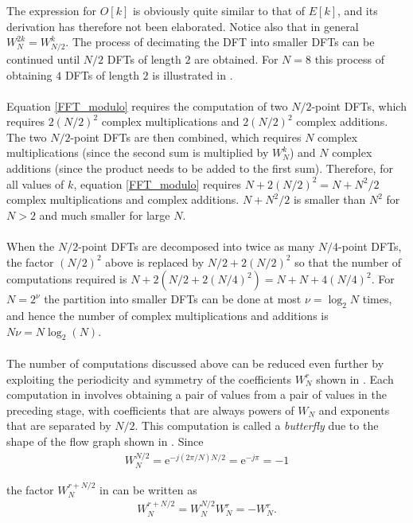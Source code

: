 The expression for $O[k]$ is obviously quite similar to that of $E[k]$, and its derivation has therefore not been elaborated. Notice also that in general $W_N^{2k} = W_{N/2}^k$. The process of decimating the DFT into smaller DFTs can be continued until $N/2$ DFTs of length $2$ are obtained. For $N = 8$ this process of obtaining $4$ DFTs of length $2$ is illustrated in \cite{figures 4-9, page 758-761, DTSP}.
\\ \\
Equation \eqref{FFT_modulo} requires the computation of two $N/2$-point DFTs, which requires $2(N/2)^2$ complex multiplications and $2(N/2)^2$ complex additions. The two $N/2$-point DFTs are then combined, which requires $N$ complex multiplications (since the second sum is multiplied by $W_N^k$) and $N$ complex additions (since the product needs to be added to the first sum). Therefore, for all values of $k$, equation \eqref{FFT_modulo} requires $N + 2(N/2)^2 = N + N^2/2$ complex multiplications and complex additions. $N + N^2/2$ is smaller than $N^2$ for $N > 2$ and much smaller for large $N$.
\\ \\
When the $N/2$-point DFTs are decomposed into twice as many $N/4$-point DFTs, the factor $(N/2)^2$ above is replaced by $N/2 + 2(N/2)^2$ so that the number of computations required is $N + 2(N/2+2(N/4)^2) = N + N + 4(N/4)^2$. For $N = 2^\nu$ the partition into smaller DFTs can be done at most $\nu = \log_2 N$ times, and hence the number of complex multiplications and additions is $N \nu = N \log_2 (N)$.
\\ \\
The number of computations discussed above can be reduced even further by exploiting the periodicity and symmetry of the coefficients $W_N^r$ shown in \cite{figure 8, DTSP}. Each computation in \cite{figure 9, DTSP} involves obtaining a pair of values from a pair of values in the preceding stage, with coefficients that are always powers of $W_N$ and exponents that are separated by $N/2$. This computation is called a \textit{butterfly} due to the shape of the flow graph shown in \cite{figure 8, DTSP}. Since 
\begin{align*}
W_N^{N/2} = \text{e}^{-j(2\pi/N)N/2} = \text{e}^{-j\pi} = -1
\end{align*}

the factor $W_N^{r+N/2}$ in \cite{figure 8, DTSP} can be written as
\begin{align*}
W_N^{r+N/2} = W_N^{N/2} W_N^r = -W_N^r.
\end{align*}

